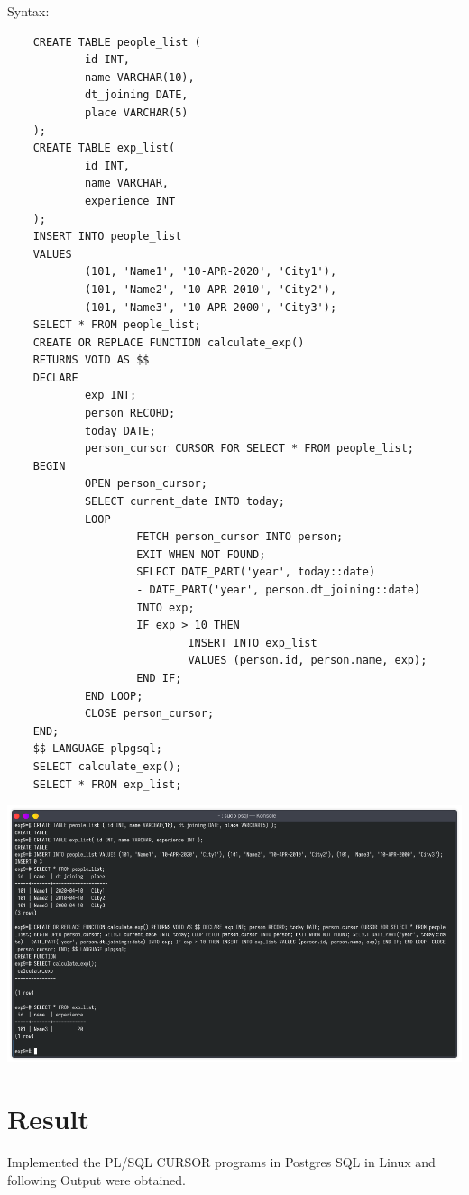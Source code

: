 \documentclass[13pt,oneside]{book}
\begin{document}
\begin{itemize}
    Syntax:
    \begin{verbatim}
    CREATE TABLE people_list (
            id INT,
            name VARCHAR(10),
            dt_joining DATE,
            place VARCHAR(5)
    );
    CREATE TABLE exp_list(
            id INT,
            name VARCHAR,
            experience INT
    );
    INSERT INTO people_list
    VALUES
            (101, 'Name1', '10-APR-2020', 'City1'),
            (101, 'Name2', '10-APR-2010', 'City2'),
            (101, 'Name3', '10-APR-2000', 'City3');
    SELECT * FROM people_list;
    CREATE OR REPLACE FUNCTION calculate_exp()
    RETURNS VOID AS $$
    DECLARE
            exp INT;
            person RECORD;
            today DATE;
            person_cursor CURSOR FOR SELECT * FROM people_list;
    BEGIN
            OPEN person_cursor;
            SELECT current_date INTO today;
            LOOP
                    FETCH person_cursor INTO person;
                    EXIT WHEN NOT FOUND;
                    SELECT DATE_PART('year', today::date) 
                    - DATE_PART('year', person.dt_joining::date)
                    INTO exp;
                    IF exp > 10 THEN
                            INSERT INTO exp_list 
                            VALUES (person.id, person.name, exp);
                    END IF;
            END LOOP;
            CLOSE person_cursor;
    END;
    $$ LANGUAGE plpgsql;
    SELECT calculate_exp();
    SELECT * FROM exp_list;
    \end{verbatim}
    \includegraphics[width=\textwidth]{img/p9/ss3.png}
\end{itemize}
\section*{Result}
Implemented the PL/SQL CURSOR programs in Postgres SQL in Linux and following Output were obtained.
\end{document}

